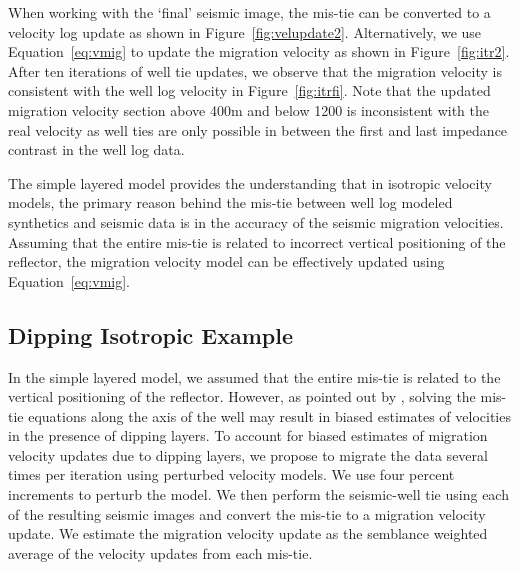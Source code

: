 When working with the `final' seismic image, the mis-tie can be converted to a velocity log update as shown in Figure~\ref{fig:velupdate2}. Alternatively, we use Equation~\ref{eq:vmig} to update the migration velocity as shown in Figure~\ref{fig:itr2}. After ten iterations of well tie updates, we observe that the migration velocity is consistent with the well log velocity in Figure~\ref{fig:itrfi}. Note that the updated migration velocity section above 400m and below 1200 is inconsistent with the real velocity as well ties are only possible in between the first and last impedance contrast in the well log data.


The simple layered model provides the understanding that in isotropic velocity models, the primary reason behind the mis-tie between well log modeled synthetics and seismic data is in the accuracy of the seismic migration velocities. Assuming that the entire mis-tie is related to incorrect vertical positioning of the reflector, the migration velocity model can be effectively updated using Equation~\ref{eq:vmig}.

\subsection{Dipping Isotropic Example}

In the simple layered model, we assumed that the entire mis-tie is related to the vertical positioning of the reflector. However, as pointed out by \cite{bakulin2010localized}, solving the mis-tie equations along the axis of the well may result in biased estimates of velocities in the presence of dipping layers. To account for biased estimates of migration velocity updates due to dipping layers, we propose to migrate the data several times per iteration using perturbed velocity models. We use four percent increments to perturb the model. We then perform the seismic-well tie using each of the resulting seismic images and convert the mis-tie to a migration velocity update. We estimate the migration velocity update as the semblance weighted average of the velocity updates from each mis-tie.


